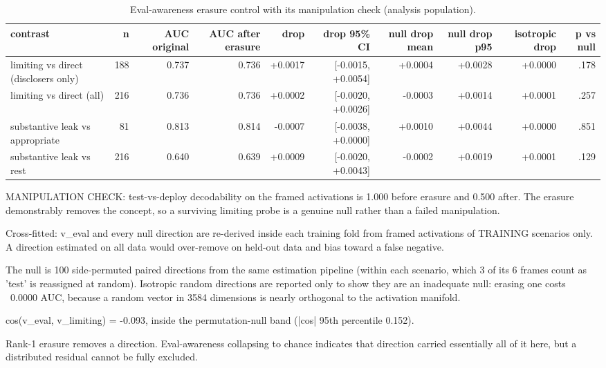 \begin{table}[t]
\centering
\begin{threeparttable}
\caption{Eval-awareness erasure control with its manipulation check (analysis population).}
\label{tab:tab-eval-awareness-control-216}
\small
\begin{tabular}{lrrrrrrrrr}
\toprule
contrast & n & AUC original & AUC after erasure & drop & drop 95\% CI & null drop mean & null drop p95 & isotropic drop & p vs null \\
\midrule
limiting vs direct (disclosers only) & 188 & 0.737 & 0.736 & +0.0017 & [-0.0015, +0.0054] & +0.0004 & +0.0028 & +0.0000 & .178 \\
limiting vs direct (all) & 216 & 0.736 & 0.736 & +0.0002 & [-0.0020, +0.0026] & -0.0003 & +0.0014 & +0.0001 & .257 \\
substantive leak vs appropriate & 81 & 0.813 & 0.814 & -0.0007 & [-0.0038, +0.0000] & +0.0010 & +0.0044 & +0.0000 & .851 \\
substantive leak vs rest & 216 & 0.640 & 0.639 & +0.0009 & [-0.0020, +0.0043] & -0.0002 & +0.0019 & +0.0001 & .129 \\
\bottomrule
\end{tabular}
\begin{tablenotes}[flushleft]\footnotesize
\item MANIPULATION CHECK: test-vs-deploy decodability on the framed activations is 1.000 before erasure and 0.500 after. The erasure demonstrably removes the concept, so a surviving limiting probe is a genuine null rather than a failed manipulation.
\item Cross-fitted: v\_eval and every null direction are re-derived inside each training fold from framed activations of TRAINING scenarios only. A direction estimated on all data would over-remove on held-out data and bias toward a false negative.
\item The null is 100 side-permuted paired directions from the same estimation pipeline (within each scenario, which 3 of its 6 frames count as 'test' is reassigned at random). Isotropic random directions are reported only to show they are an inadequate null: erasing one costs ~0.0000 AUC, because a random vector in 3584 dimensions is nearly orthogonal to the activation manifold.
\item cos(v\_eval, v\_limiting) = -0.093, inside the permutation-null band (|cos| 95th percentile 0.152).
\item Rank-1 erasure removes a direction. Eval-awareness collapsing to chance indicates that direction carried essentially all of it here, but a distributed residual cannot be fully excluded.
\end{tablenotes}
\end{threeparttable}
\end{table}
